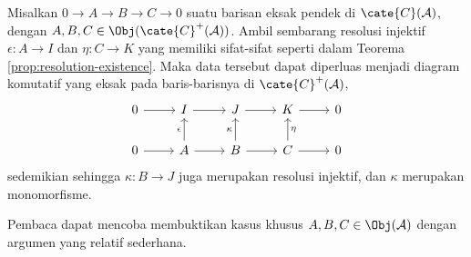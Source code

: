 \begin{proposisi}\label{prop:horseshoe}
	Misalkan $0 \to A \to B \to C \to 0$ suatu barisan eksak pendek di $\cate{C}(\mathcal{A})$, dengan $A, B, C \in \Obj(\cate{C}^+(\mathcal{A}))$. Ambil sembarang resolusi injektif $\epsilon: A \to I$ dan $\eta: C \to K$ yang memiliki sifat-sifat seperti dalam Teorema \ref{prop:resolution-existence}. Maka data tersebut dapat diperluas menjadi diagram komutatif yang eksak pada baris-barisnya di $\cate{C}^+(\mathcal{A})$,
	\[\begin{tikzcd}
		0 \arrow[r] & I \arrow[r] & J \arrow[r] & K \arrow[r] & 0 \\
		0 \arrow[r] & A \arrow[r] \arrow[u, "\epsilon"] & B \arrow[r] \arrow[u, "\kappa"] & C \arrow[r] \arrow[u, "\eta"'] & 0 
	\end{tikzcd}\]
	sedemikian sehingga $\kappa: B \to J$ juga merupakan resolusi injektif, dan $\kappa$ merupakan monomorfisme.
\end{proposisi}

Pembaca dapat mencoba membuktikan kasus khusus $A, B, C \in \Obj(\mathcal{A})$ dengan argumen yang relatif sederhana.

